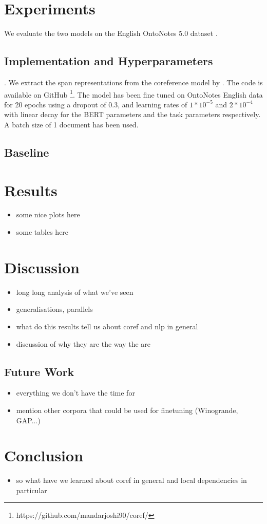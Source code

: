 \documentclass[11pt]{article}
\begin{document}
\section{Experiments}

We evaluate the two models on the English OntoNotes 5.0 dataset \cite{conll}. 



\subsection{Implementation and Hyperparameters}. We extract the span representations from the coreference model by \textcite{joshi2019coref}. The code is available on GitHub \footnote{https://github.com/mandarjoshi90/coref/}. The model has been fine tuned on OntoNotes English data for 20 epochs using a dropout of 0.3, and learning rates of $1 * 10 ^{-5}$ and $2 * 10 ^{-4} $ with linear decay for the BERT parameters and the task parameters respectively. A batch size of 1 document has been used. 

\subsection{Baseline}




\section{Results}

\begin{itemize}
\item some nice plots here
\item some tables here
\end{itemize}

\section{Discussion}

\begin{itemize}
\item long long analysis of what we've seen
\item generalisations, parallels
\item what do this results tell us about coref and nlp in general
\item discussion of why they are the way the are
\end{itemize}

\subsection{Future Work}
\begin{itemize}
\item everything we don't have the time for
\item mention other corpora that could be used for finetuning (Winogrande, GAP...)

\end{itemize}

\section{Conclusion}

\begin{itemize}
\item so what have we learned about coref in general and local dependencies in particular
\end{itemize}

\printbibliography
\end{document}
